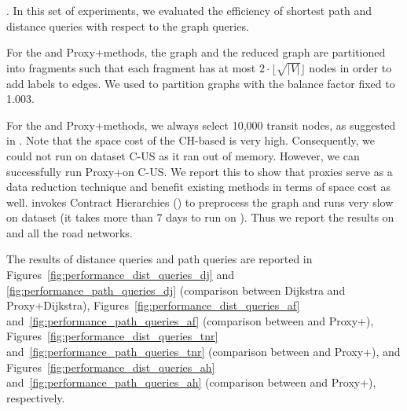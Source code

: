 .
%
In this set of experiments, we evaluated the efficiency of shortest path and distance queries with respect to the graph queries. 

For the \arcflag and Proxy+\arcflag methods, the graph and the reduced graph are partitioned into fragments such that each fragment has at most $2\cdot \lfloor\sqrt{|V|}\rfloor$ nodes in order to add labels to edges. We used \metis to partition graphs with the balance factor fixed to 1.003. 

For the \tnr and Proxy+\tnr methods, we always select 10,000 transit nodes, as suggested in \cite{arz2013transit}. Note that the space cost of the CH-based \tnr is very high. Consequently, we could not run \tnr on dataset C-US as it ran out of memory. However, we can successfully run Proxy+\tnr on C-US. We report this to show that proxies serve as a data reduction technique and benefit existing methods in terms of space cost as well. \tnr invokes Contract Hierarchies (\ch) to preprocess the graph and \ch runs very slow on \dblp dataset (it takes more than 7 days to run \ch on \dblp). Thus we report the results on \dblpone and all the road networks. 

The results of distance queries and path queries are reported in Figures~\ref{fig:performance_dist_queries_dj} and \ref{fig:performance_path_queries_dj} (comparison between Dijkstra and Proxy+Dijkstra), Figures~\ref{fig:performance_dist_queries_af} and~\ref{fig:performance_path_queries_af} (comparison between \arcflag and Proxy+\arcflag), Figures~\ref{fig:performance_dist_queries_tnr} and~\ref{fig:performance_path_queries_tnr} (comparison between \tnr and Proxy+\tnr), and Figures~\ref{fig:performance_dist_queries_ah} and~\ref{fig:performance_path_queries_ah} (comparison between \ah and Proxy+\ah), respectively.

